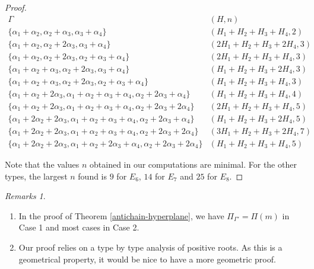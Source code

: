 \documentclass[10pt,a4paper]{amsart}
\numberwithin{equation}{section}
\theoremstyle{plain}
\theoremstyle{definition}
\theoremstyle{remark}
\newtheorem{remarks}[theorem]{Remarks}
\begin{document}
\begin{proof}
{\scriptsize$$
\begin{array}{c|c}
\Gamma & ( H , n ) \\ 
\hline \hline
\{ \alpha_{1}+\alpha_{2} , \alpha_{2}+\alpha_{3} , \alpha_{3}+\alpha_{4} \}
& ( H_{1}+H_{2}+H_{3}+H_{4} , 2 ) \\
\hline 
\{ \alpha_{1}+\alpha_{2} , \alpha_{2}+2\alpha_{3} ,\alpha_{3}+\alpha_{4} \}
& (2H_{1} + H_{2} + H_{3}+2H_{4} , 3)  \\ 
\hline 
\{ \alpha_{1}+\alpha_{2} , \alpha_{2}+2\alpha_{3} ,\alpha_{2}+\alpha_{3}+\alpha_{4} \}
& (2H_{1} + H_{2} + H_{3}+H_{4} , 3) \\
\hline 
\{ \alpha_{1}+\alpha_{2}+\alpha_{3} , \alpha_{2}+2\alpha_{3} , \alpha_{3}+\alpha_{4} \}
& (H_{1} + H_{2}+ H_{3}+2H_{4} , 3) \\
\hline 
\{ \alpha_{1}+\alpha_{2}+\alpha_{3} , \alpha_{2}+2\alpha_{3} ,\alpha_{2}+\alpha_{3}+\alpha_{4} \} 
& (H_{1}+H_{2}+H_{3}+H_{4} , 3) \\
\hline 
\{ \alpha_{1}+\alpha_{2}+2\alpha_{3} , \alpha_{1}+\alpha_{2}+\alpha_{3}+\alpha_{4} ,
\alpha_{2}+2\alpha_{3}+\alpha_{4} \} & (H_{1}+H_{2}+H_{3}+H_{4} , 4) \\ 
\hline 
\{ \alpha_{1}+\alpha_{2}+2\alpha_{3} , \alpha_{1}+\alpha_{2}+\alpha_{3}+\alpha_{4} ,
\alpha_{2}+2\alpha_{3}+2\alpha_{4} \} & ( 2H_{1} + H_{2}+H_{3}+H_{4}, 5) \\
\hline 
\{ \alpha_{1}+2\alpha_{2}+2\alpha_{3} , \alpha_{1}+\alpha_{2}+\alpha_{3}+\alpha_{4} ,
\alpha_{2}+2\alpha_{3}+\alpha_{4} \} & (H_{1}+H_{2}+H_{3}+2H_{4} , 5) \\ 
\hline 
\{ \alpha_{1}+2\alpha_{2}+2\alpha_{3} , \alpha_{1}+\alpha_{2}+\alpha_{3}+\alpha_{4} ,
\alpha_{2}+2\alpha_{3}+2\alpha_{4} \} & (3H_{1} +H_{2}+H_{3}+2H_{4} , 7) \\ 
\hline 
\{ \alpha_{1}+2\alpha_{2}+2\alpha_{3} , \alpha_{1}+\alpha_{2}+2\alpha_{3}+\alpha_{4} ,
\alpha_{2}+2\alpha_{3}+2\alpha_{4} \} & (H_{1}+H_{2}+H_{3}+H_{4} , 5) 
\end{array}
$$}

\noindent Note that the values $n$ obtained in our computations are minimal. For the other types, 
the largest $n$ found is $9$ for $E_{6}$, $14$ for $E_{7}$ and $25$ for $E_{8}$.
\end{proof}

\begin{remarks}
\begin{enumerate}
\item In the proof of Theorem \ref{antichain-hyperplane}, we have $\Pi_{\Gamma'} =\Pi (m)$ in Case 1 
and most cases in Case 2.
\item Our proof relies on a type by type analysis of positive roots. As this is a geometrical property,
it would be nice to have a more geometric proof.
\end{enumerate}
\end{remarks}
\end{document}
